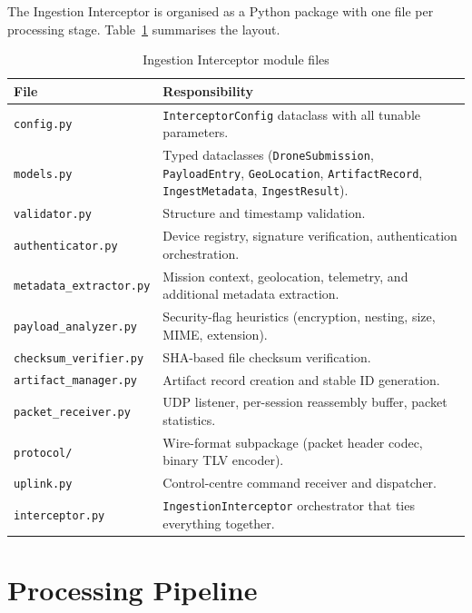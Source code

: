 \documentclass[12pt, a4paper]{report}
\begin{document}
The Ingestion Interceptor is organised as a Python package with one file
per processing stage. Table~\ref{tab:ii_files} summarises the layout.

\begin{table}[H]
\centering
\caption{Ingestion Interceptor module files}
\label{tab:ii_files}
\begin{tabular}{|l|p{10cm}|}
\hline
\textbf{File} & \textbf{Responsibility} \\
\hline
\texttt{config.py} & \texttt{InterceptorConfig} dataclass with all tunable parameters. \\
\hline
\texttt{models.py} & Typed dataclasses (\texttt{DroneSubmission}, \texttt{PayloadEntry}, \texttt{GeoLocation}, \texttt{ArtifactRecord}, \texttt{IngestMetadata}, \texttt{IngestResult}). \\
\hline
\texttt{validator.py} & Structure and timestamp validation. \\
\hline
\texttt{authenticator.py} & Device registry, signature verification, authentication orchestration. \\
\hline
\texttt{metadata\_extractor.py} & Mission context, geolocation, telemetry, and additional metadata extraction. \\
\hline
\texttt{payload\_analyzer.py} & Security-flag heuristics (encryption, nesting, size, MIME, extension). \\
\hline
\texttt{checksum\_verifier.py} & SHA-based file checksum verification. \\
\hline
\texttt{artifact\_manager.py} & Artifact record creation and stable ID generation. \\
\hline
\texttt{packet\_receiver.py} & UDP listener, per-session reassembly buffer, packet statistics. \\
\hline
\texttt{protocol/} & Wire-format subpackage (packet header codec, binary TLV encoder). \\
\hline
\texttt{uplink.py} & Control-centre command receiver and dispatcher. \\
\hline
\texttt{interceptor.py} & \texttt{IngestionInterceptor} orchestrator that ties everything together. \\
\hline
\end{tabular}
\end{table}

\section{Processing Pipeline}
\end{document}
